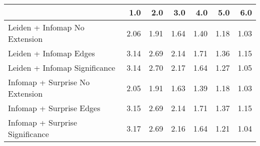 \begin{tabular}{lrrrrrr}
\toprule
{} &  1.0 &  2.0 &  3.0 &  4.0 &  5.0 &  6.0 \\
\midrule
Leiden + Infomap No Extension   & 2.06 & 1.91 & 1.64 & 1.40 & 1.18 & 1.03 \\
Leiden + Infomap Edges          & 3.14 & 2.69 & 2.14 & 1.71 & 1.36 & 1.15 \\
Leiden + Infomap Significance   & 3.14 & 2.70 & 2.17 & 1.64 & 1.27 & 1.05 \\
Infomap + Surprise No Extension & 2.05 & 1.91 & 1.63 & 1.39 & 1.18 & 1.03 \\
Infomap + Surprise Edges        & 3.15 & 2.69 & 2.14 & 1.71 & 1.37 & 1.15 \\
Infomap + Surprise Significance & 3.17 & 2.69 & 2.16 & 1.64 & 1.21 & 1.04 \\
\bottomrule
\end{tabular}

